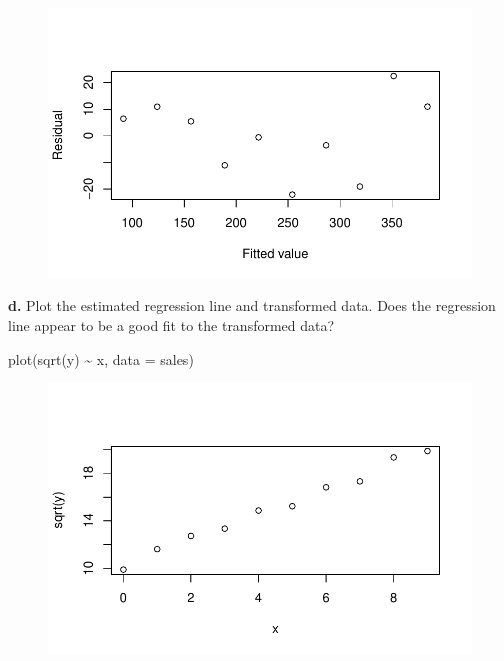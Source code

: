 \documentclass[
  letterpaper,
  DIV=11,
  numbers=noendperiod]{scrartcl}
\newenvironment{Shaded}{\begin{snugshade}}{\end{snugshade}}
\newcommand{\AttributeTok}[1]{\textcolor[rgb]{0.40,0.45,0.13}{#1}}
\newcommand{\FunctionTok}[1]{\textcolor[rgb]{0.28,0.35,0.67}{#1}}
\newcommand{\NormalTok}[1]{\textcolor[rgb]{0.00,0.23,0.31}{#1}}
\newcommand{\SpecialCharTok}[1]{\textcolor[rgb]{0.37,0.37,0.37}{#1}}
\begin{document}
\begin{figure}[H]

{\centering \includegraphics{sta9700_ch3_hw_files/figure-pdf/unnamed-chunk-31-1.pdf}

}

\end{figure}

\textbf{d.} Plot the estimated regression line and transformed data.
Does the regression line appear to be a good fit to the transformed
data?

\begin{Shaded}
\begin{Highlighting}[]
\FunctionTok{plot}\NormalTok{(}\FunctionTok{sqrt}\NormalTok{(y) }\SpecialCharTok{\textasciitilde{}}\NormalTok{ x, }\AttributeTok{data =}\NormalTok{ sales)}
\end{Highlighting}
\end{Shaded}

\begin{figure}[H]

{\centering \includegraphics{sta9700_ch3_hw_files/figure-pdf/unnamed-chunk-32-1.pdf}

}

\end{figure}
\end{document}
